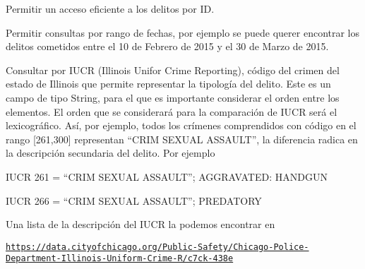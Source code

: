 \begin{DoxyItemize}
\item Permitir un acceso eficiente a los delitos por I\+D.\end{DoxyItemize}
\begin{DoxyItemize}
\item Permitir consultas por rango de fechas, por ejemplo se puede querer encontrar los delitos cometidos entre el 10 de Febrero de 2015 y el 30 de Marzo de 2015.\end{DoxyItemize}
\begin{DoxyItemize}
\item Consultar por I\+U\+C\+R (Illinois Unifor Crime Reporting), código del crimen del estado de Illinois que permite representar la tipología del delito. Este es un campo de tipo String, para el que es importante considerar el orden entre los elementos. El orden que se considerará para la comparación de I\+U\+C\+R será el lexicográfico. Así, por ejemplo, todos los crímenes comprendidos con código en el rango \mbox{[}261,300\mbox{]} representan “\+C\+R\+I\+M S\+E\+X\+U\+A\+L A\+S\+S\+A\+U\+L\+T”, la diferencia radica en la descripción secundaria del delito. Por ejemplo\end{DoxyItemize}
\begin{DoxyItemize}
\item I\+U\+C\+R 261 = “\+C\+R\+I\+M S\+E\+X\+U\+A\+L A\+S\+S\+A\+U\+L\+T”; A\+G\+G\+R\+A\+V\+A\+T\+E\+D\+: H\+A\+N\+D\+G\+U\+N \item I\+U\+C\+R 266 = “\+C\+R\+I\+M S\+E\+X\+U\+A\+L A\+S\+S\+A\+U\+L\+T”; P\+R\+E\+D\+A\+T\+O\+R\+Y\end{DoxyItemize}
Una lista de la descripción del I\+U\+C\+R la podemos encontrar en

\href{https://data.cityofchicago.org/Public-Safety/Chicago-Police-Department-Illinois-Uniform-Crime-R/c7ck-438e}{\tt https\+://data.\+cityofchicago.\+org/\+Public-\/\+Safety/\+Chicago-\/\+Police-\/\+Department-\/\+Illinois-\/\+Uniform-\/\+Crime-\/\+R/c7ck-\/438e}

